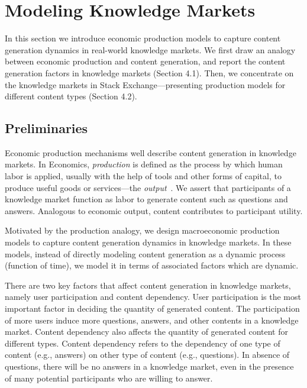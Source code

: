 \section{Modeling Knowledge Markets}
In this section we introduce economic production models to capture content generation dynamics in real-world knowledge markets. We first draw an analogy between economic production and content generation, and report the content generation factors in knowledge markets (Section 4.1). Then, we concentrate on the knowledge markets in Stack Exchange---presenting production models for different content types (Section 4.2).

\subsection{Preliminaries} 
Economic production mechanisms well describe content generation in knowledge markets. In Economics, \emph{production} is defined as the process by which human labor is applied, usually with the help of tools and other forms of capital, to produce useful goods or services---the \emph{output}~\cite{stanford2008economics}. We assert that participants of a knowledge market function as labor to generate content such as questions and answers. Analogous to economic output, content contributes to participant utility. 

Motivated by the production analogy, we design macroeconomic production models to capture content generation dynamics in knowledge markets. In these models, instead of directly modeling content generation as a dynamic process (function of time), we model it in terms of associated factors which are dynamic. 

There are two key factors that affect content generation in knowledge markets, namely user participation and content dependency. User participation is the most important factor in deciding the quantity of generated content. The participation of more users induce more questions, answers, and other contents in a knowledge market. Content dependency also affects the quantity of generated content for different types. Content dependency refers to the dependency of one type of content (e.g., answers) on other type of content (e.g., questions). In absence of questions, there will be no answers in a knowledge market, even in the presence of many potential participants who are willing to answer. 


